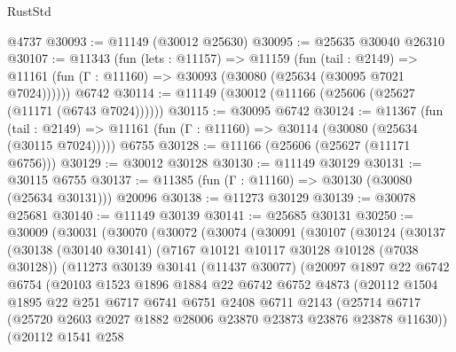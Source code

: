 \begin{lexlean}{RustStd}
\begin{coremodule}
    @4737
@30093 := @11149 (@30012 @25630)
@30095 := @25635 @30040 @26310
@30107 := @11343
    (fun (lets : @11157) =>
    @11159
      (fun (tail : @2149) =>
      @11161 (fun (Γ : @11160) => @30093 (@30080 (@25634 (@30095 @7021 @7024))))))
    @6742
@30114 := @11149 (@30012 (@11166 (@25606 (@25627 (@11171 (@6743 @7024))))))
@30115 := @30095 @6742
@30124 := @11367
    (fun (tail : @2149) => @11161 (fun (Γ : @11160) => @30114 (@30080 (@25634 (@30115 @7024)))))
    @6755
@30128 := @11166 (@25606 (@25627 (@11171 @6756)))
@30129 := @30012 @30128
@30130 := @11149 @30129
@30131 := @30115 @6755
@30137 := @11385 (fun (Γ : @11160) => @30130 (@30080 (@25634 @30131))) @20096
@30138 := @11273 @30129
@30139 := @30078 @25681
@30140 := @11149 @30139
@30141 := @25685 @30131
@30250 := @30009
    (@30031
      (@30070
        (@30072
          (@30074
            (@30091
              (@30107
                (@30124
                  (@30137
                    (@30138
                      (@30140 @30141)
                      (@7167 @10121 @10117 @30128 @10128 (@7038 @30128))
                      (@11273
                        @30139
                        @30141
                        (@11437 @30077)
                        (@20097
                          @1897
                          @22
                          @6742
                          @6754
                          (@20103
                            @1523
                            @1896
                            @1884
                            @22
                            @6742
                            @6752
                            @4873
                            (@20112
                              @1504
                              @1895
                              @22
                              @251
                              @6717
                              @6741
                              @6751
                              @2408
                              @6711
                              @2143
                              (@25714
                                @6717
                                (@25720
                                  @2603
                                  @2027
                                  @1882
                                  @28006
                                  @23870
                                  @23873
                                  @23876
                                  @23878
                                  @11630))
                              (@20112
                                @1541
                                @258

\end{coremodule}
\end{lexlean}
